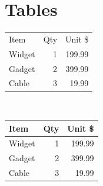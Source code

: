 \documentclass{article}
\begin{document}
\newpage
\newpage
\section*{Tables}

\begin{tabular}{lrr}
Item & Qty & Unit \$ \\
Widget & 1 & 199.99 \\
Gadget & 2 & 399.99 \\
Cable & 3 & 19.99 \\
\end{tabular}
\\[6pt]

\begin{tabular}{|l|r|r|} \hline
Item & Qty & Unit \$ \\\hline
Widget & 1 & 199.99 \\
Gadget & 2 & 399.99 \\
Cable & 3 & 19.99 \\\hline
\end{tabular}

\end{document}
